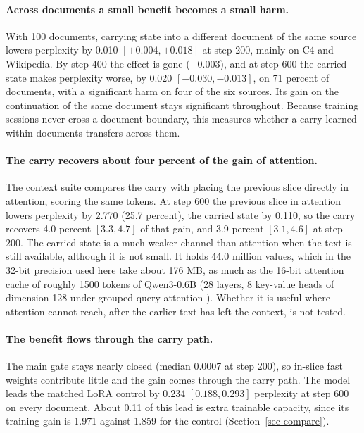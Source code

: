 \documentclass[12pt,a4paper]{report}
\begin{document}
\paragraph{Across documents a small benefit becomes a small harm.} With 100 documents, carrying state into a different document of the same source lowers perplexity by 0.010 $[+0.004, +0.018]$ at step 200, mainly on C4 and Wikipedia. By step 400 the effect is gone ($-0.003$), and at step 600 the carried state makes perplexity worse, by 0.020 $[-0.030, -0.013]$, on 71 percent of documents, with a significant harm on four of the six sources. Its gain on the continuation of the same document stays significant throughout. Because training sessions never cross a document boundary, this measures whether a carry learned within documents transfers across them.

\paragraph{The carry recovers about four percent of the gain of attention.} The context suite compares the carry with placing the previous slice directly in attention, scoring the same tokens. At step 600 the previous slice in attention lowers perplexity by 2.770 (25.7 percent), the carried state by 0.110, so the carry recovers 4.0 percent $[3.3, 4.7]$ of that gain, and 3.9 percent $[3.1, 4.6]$ at step 200. The carried state is a much weaker channel than attention when the text is still available, although it is not small. It holds 44.0 million values, which in the 32-bit precision used here take about 176 MB, as much as the 16-bit attention cache of roughly 1500 tokens of Qwen3-0.6B (28 layers, 8 key-value heads of dimension 128 under grouped-query attention \citep{ainslie2023gqa}). Whether it is useful where attention cannot reach, after the earlier text has left the context, is not tested.

\paragraph{The benefit flows through the carry path.} The main gate stays nearly closed (median 0.0007 at step 200), so in-slice fast weights contribute little and the gain comes through the carry path. The model leads the matched LoRA control by 0.234 $[0.188, 0.293]$ perplexity at step 600 on every document. About 0.11 of this lead is extra trainable capacity, since its training gain is 1.971 against 1.859 for the control (Section~\ref{sec-compare}).
\end{document}
